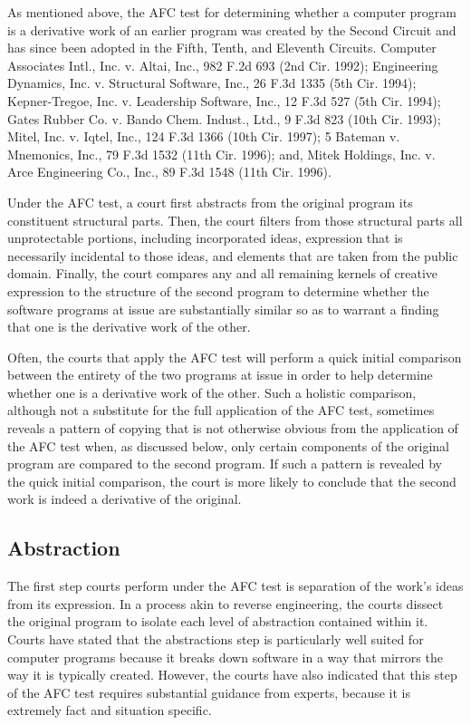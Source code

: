 As mentioned above, the AFC test for determining whether a computer
program is a derivative work of an earlier program was created by the
Second Circuit and has since been adopted in the Fifth, Tenth, and
Eleventh Circuits. Computer Associates Intl., Inc. v. Altai, Inc., 982
F.2d 693 (2nd Cir. 1992); Engineering Dynamics, Inc. v. Structural
Software, Inc., 26 F.3d 1335 (5th Cir. 1994); Kepner-Tregoe,
Inc. v. Leadership Software, Inc., 12 F.3d 527 (5th Cir. 1994); Gates
Rubber Co. v. Bando Chem. Indust., Ltd., 9 F.3d 823 (10th Cir. 1993);
Mitel, Inc. v. Iqtel, Inc., 124 F.3d 1366 (10th Cir. 1997); 5 Bateman
v. Mnemonics, Inc., 79 F.3d 1532 (11th Cir. 1996); and, Mitek Holdings,
Inc. v. Arce Engineering Co., Inc., 89 F.3d 1548 (11th Cir. 1996).

Under the AFC test, a court first abstracts from the original program its
constituent structural parts. Then, the court filters from those
structural parts all unprotectable portions, including incorporated ideas,
expression that is necessarily incidental to those ideas, and elements
that are taken from the public domain. Finally, the court compares any and
all remaining kernels of creative expression to the structure of the
second program to determine whether the software programs at issue are
substantially similar so as to warrant a finding that one is the
derivative work of the other.

Often, the courts that apply the AFC test will perform a quick initial
comparison between the entirety of the two programs at issue in order to
help determine whether one is a derivative work of the other. Such a
holistic comparison, although not a substitute for the full application of
the AFC test, sometimes reveals a pattern of copying that is not otherwise
obvious from the application of the AFC test when, as discussed below,
only certain components of the original program are compared to the second
program. If such a pattern is revealed by the quick initial comparison,
the court is more likely to conclude that the second work is indeed a
derivative of the original.

\subsection{Abstraction}

The first step courts perform under the AFC test is separation of the
work's ideas from its expression. In a process akin to reverse
engineering, the courts dissect the original program to isolate each level
of abstraction contained within it. Courts have stated that the
abstractions step is particularly well suited for computer programs
because it breaks down software in a way that mirrors the way it is
typically created. However, the courts have also indicated that this step
of the AFC test requires substantial guidance from experts, because it is
extremely fact and situation specific.

